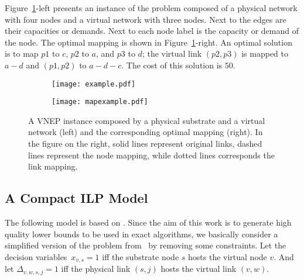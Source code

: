 \documentclass[12pt]{article}
\begin{document}
Figure~\ref{fig:example}-left presents an instance of the problem composed of a physical network with four nodes and a virtual network with three nodes. Next to the edges are their capacities or demands. Next to each node label is the capacity or demand of the node.
The optimal mapping is shown in Figure~\ref{fig:example}-right. 
An optimal solution is to map $p1$ to $c$, $p2$ to $a$, and $p3$ to $d$;
the virtual link $(p2,p3)$ is mapped to $a-d$ and $(p1,p2)$ to $a-d-c$. The cost of this solution is $50$.

\begin{figure}
  \centering
  \begin{subfigure}[b]{0.45\textwidth}
    \centering
    \texttt{[image: example.pdf]}
  \end{subfigure}\quad
  \begin{subfigure}[b]{0.45\textwidth}
    \centering
    \texttt{[image: mapexample.pdf]}
  \end{subfigure}
  \caption{A VNEP instance composed by a physical substrate and a virtual network (left) and the corresponding optimal mapping (right).
In the figure on the right, solid lines represent original links, dashed lines represent the node mapping, while dotted lines corresponds the link mapping.
\label{fig:example}}
\end{figure}






\subsection{A Compact ILP Model}
\label{sec:ILPmodel}
The following model is based on \cite{Alkmim2013}. Since the aim of this work is to generate high quality lower bounds to be used in exact algorithms, we basically consider a simplified version of the problem from~\cite{Alkmim2013} by removing some constraints.
Let the decision variables~$x_{v,s} = 1$ iff the substrate node $s$ hosts the virtual node $v$. And let $\Delta_{v,w,s,j} = 1$ iff the physical link $(s,j)$ hosts the virtual link $(v,w)$.
\end{document}
